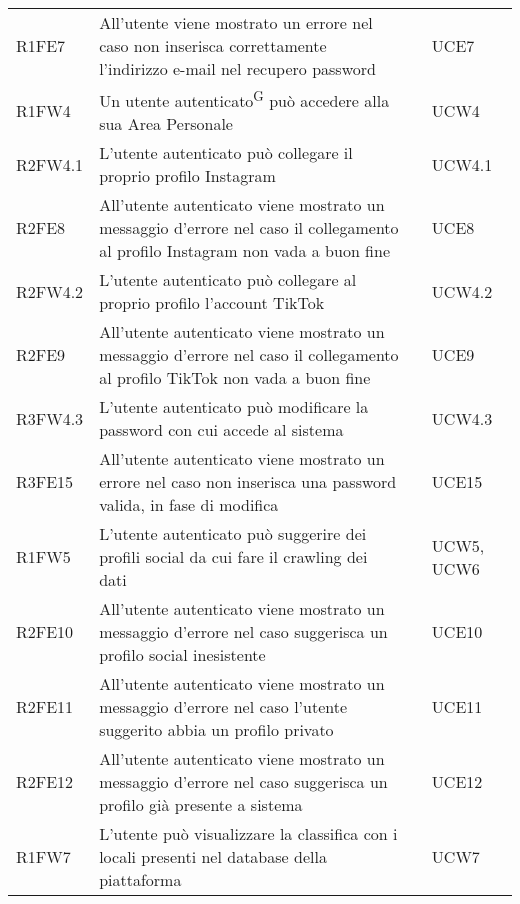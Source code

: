 \begin{longtable}{ m{}<{\centering}  m{}<{\centering}  m{}<{\centering}  m{}<{\centering}}
	R1FE7 & All’utente viene mostrato un errore nel caso non inserisca correttamente l’indirizzo e-mail nel recupero password & \Ob & UCE7\\	

	R1FW4 &	Un utente autenticato\textsuperscript{G} può accedere alla sua Area Personale & \Ob & UCW4 \\ 
	 
	R2FW4.1 & L’utente autenticato può collegare il proprio profilo Instagram  & \Ob & UCW4.1\\	
	 
	R2FE8 & All’utente autenticato viene mostrato un messaggio d’errore nel caso il collegamento al profilo Instagram non vada a buon fine & \Ob & UCE8\\	
	 
	R2FW4.2 & L’utente autenticato può collegare al proprio profilo l’account TikTok & \Ob & UCW4.2\\		 

	R2FE9 & All’utente autenticato viene mostrato un messaggio d’errore nel caso il collegamento al profilo TikTok non vada a buon fine  & \Ob & UCE9 \\		
	 
	R3FW4.3 & L’utente autenticato può modificare la password con cui accede al sistema & \Fa & UCW4.3\\				
	 
	R3FE15 & All’utente autenticato viene mostrato un errore nel caso non inserisca una password valida, in fase di modifica  & \Fa & UCE15\\			
	  	 	 	
	R1FW5 & L’utente autenticato può suggerire dei profili social da cui fare il crawling dei dati & \Ob & UCW5, UCW6\\		
	 
	R2FE10 & All’utente autenticato viene mostrato un messaggio d’errore nel caso suggerisca un profilo social inesistente & \De & UCE10\\		

	R2FE11 & All’utente autenticato viene mostrato un messaggio d’errore nel caso l’utente suggerito abbia un profilo privato & \De & UCE11\\
	 
	R2FE12 & All’utente autenticato viene mostrato un messaggio d’errore nel caso suggerisca un profilo già presente a sistema & \De & UCE12\\			
	 
	R1FW7 & L’utente può visualizzare la classifica con i locali presenti nel database della piattaforma & \Ob & UCW7\\	
	 

\end{longtable}
